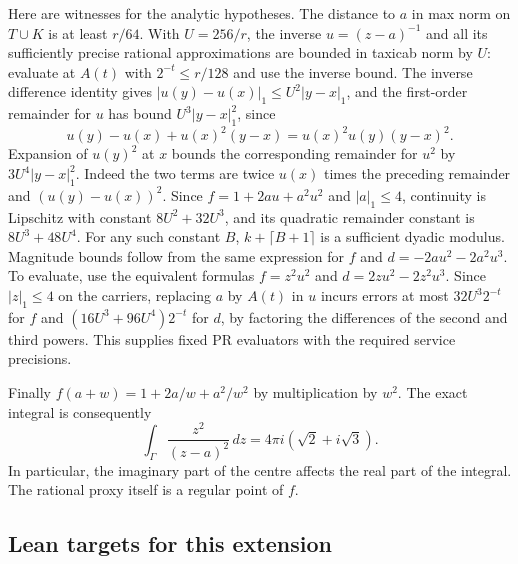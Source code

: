 Here are witnesses for the analytic hypotheses. The distance to $a$ in
max norm on $T\cup K$ is at least $r/64$. With $U=256/r$, the inverse
$u=(z-a)^{-1}$ and all its sufficiently precise rational approximations
are bounded in taxicab norm by $U$: evaluate at $A(t)$ with
$2^{-t}\le r/128$ and use the inverse bound. The inverse difference
identity gives $|u(y)-u(x)|_1\le U^2|y-x|_1$, and the first-order
remainder for $u$ has bound $U^3|y-x|_1^2$, since
\[
 u(y)-u(x)+u(x)^2(y-x)=u(x)^2u(y)(y-x)^2 .
\]
Expansion of $u(y)^2$ at $x$ bounds the corresponding remainder for
$u^2$ by $3U^4|y-x|_1^2$. Indeed the two terms are twice $u(x)$
times the preceding remainder and $(u(y)-u(x))^2$. Since
$f=1+2au+a^2u^2$ and $|a|_1\le4$, continuity is Lipschitz with constant
$8U^2+32U^3$, and its quadratic remainder constant is $8U^3+48U^4$.
For any such constant $B$, $k+\lceil B+1\rceil$ is a sufficient dyadic
modulus. Magnitude bounds follow from the same expression for $f$
and $d=-2au^2-2a^2u^3$. To evaluate, use the equivalent formulas
$f=z^2u^2$ and $d=2zu^2-2z^2u^3$. Since $|z|_1\le4$ on the
carriers, replacing $a$ by $A(t)$ in $u$ incurs errors at most
$32U^3 2^{-t}$ for $f$ and $(16U^3+96U^4)2^{-t}$ for $d$, by factoring
the differences of the second and third powers. This supplies fixed
PR evaluators with the required service precisions.

Finally $f(a+w)=1+2a/w+a^2/w^2$ by multiplication by $w^2$.
The exact integral is consequently
\[
 \int_\Gamma \frac{z^2}{(z-a)^2}\,dz=4\pi i(\sqrt2+i\sqrt3).
\]
In particular, the imaginary part of the centre affects the real
part of the integral. The rational proxy itself is a regular point of $f$.

\subsection{Lean targets for this extension}

